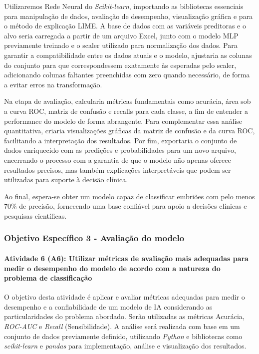 Utilizaremos Rede Neural do \textit{Scikit-learn}, importando as bibliotecas essenciais para manipulação de dados, avaliação de desempenho, visualização gráfica e para o método de explicação LIME. A base de dados com as variáveis preditoras e o alvo seria carregada a partir de um arquivo Excel, junto com o modelo MLP previamente treinado e o scaler utilizado para normalização dos dados. Para garantir a compatibilidade entre os dados atuais e o modelo, ajustaria as colunas do conjunto para que correspondessem exatamente às esperadas pelo scaler, adicionando colunas faltantes preenchidas com zero quando necessário, de forma a evitar erros na transformação.

Na etapa de avaliação, calcularia métricas fundamentais como acurácia, área sob a curva ROC, matriz de confusão e recalls para cada classe, a fim de entender a performance do modelo de forma abrangente. Para complementar essa análise quantitativa, criaria visualizações gráficas da matriz de confusão e da curva ROC, facilitando a interpretação dos resultados. Por fim, exportaria o conjunto de dados enriquecido com as predições e probabilidades para um novo arquivo, encerrando o processo com a garantia de que o modelo não apenas oferece resultados precisos, mas também explicações interpretáveis que podem ser utilizadas para suporte à decisão clínica.

Ao final, espera-se obter um modelo capaz de classificar embriões com pelo menos 70\% de precisão, fornecendo uma base confiável para apoio a decisões clínicas e pesquisas científicas.

\subsubsection{\textbf{Objetivo Específico 3} - Avaliação do modelo}

\paragraph{\textbf{Atividade 6 (A6):} Utilizar métricas de avaliação mais adequadas para medir o desempenho do modelo de acordo com a natureza do problema de classificação}

O objetivo desta atividade é aplicar e avaliar métricas adequadas para medir o desempenho e a confiabilidade de um modelo de IA considerando as particularidades do problema abordado. Serão utilizadas as métricas Acurácia, \textit{ROC-AUC} e \textit{Recall} (Sensibilidade). A análise será realizada com base em um conjunto de dados previamente definido, utilizando \textit{Python} e bibliotecas como \textit{scikit-learn} e \textit{pandas} para implementação, análise e visualização dos resultados.

